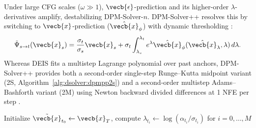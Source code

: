\documentclass[../../../../master.tex]{subfiles}
\begin{document}
Under large CFG scales ($\omega \gg 1$), $\vecb{\epsilon}$-prediction and its higher-order $\lambda$-derivatives amplify, destabilizing DPM-Solver-$n$. DPM-Solver++ resolves this by switching to $\vecb{x}$-prediction ($\hat{\vecb{x}}_\phi$) with dynamic thresholding :
\begin{equation}
  \label{eq:dsolver:dpmpp_exact}
  \tilde{\Psi}_{s\to t}(\vecb{x}_s) = \frac{\sigma_t}{\sigma_s}\vecb{x}_s + \sigma_t \int_{\lambda_s}^{\lambda_t} e^{\lambda} \hat{\vecb{x}}_\phi(\hat{\vecb{x}}_\lambda, \lambda)\,d\lambda.
\end{equation}
Whereas DEIS fits a multistep Lagrange polynomial over past anchors, DPM-Solver++ provides both a second-order single-step Runge--Kutta midpoint variant (2S, Algorithm~\ref{alg:dsolver:dpmpp2s}) and a second-order multistep Adams--Bashforth variant (2M) using Newton backward divided differences at 1 NFE per step .

\begin{algorithm}[htbp]
  \caption{DPM-Solver++(2S) Midpoint Sampling }
  \label{alg:dsolver:dpmpp2s}
  Initialize $\tilde{\vecb{x}}_{t_0} \gets \vecb{x}_T$, compute $\lambda_{t_i} \gets \log(\alpha_{t_i}/\sigma_{t_i})$ for $i=0,\dots,M$\;
\end{algorithm}
\end{document}
